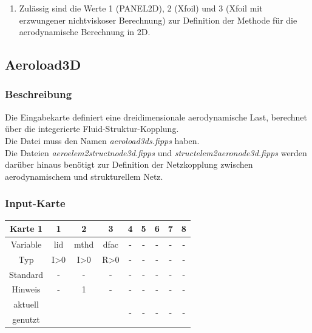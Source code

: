 \documentclass[11pt,titlepage,listof=totoc,bibliography=totoc,twoside]{scrreprt}
\begin{document}
{{\begin{enumerate}
\item Zulässig sind die Werte 1 (PANEL2D), 2 (Xfoil) und 3 (Xfoil mit erzwungener nichtviskoser Berechnung) zur Definition der Methode für die aerodynamische Berechnung in 2D.
\end{enumerate}

\newpage

\subsection{Aeroload3D}

\subsubsection{Beschreibung}

Die Eingabekarte definiert eine dreidimensionale aerodynamische Last, berechnet über die integerierte Fluid-Struktur-Kopplung.\\
Die Datei muss den Namen \emph{aeroload3ds.fipps} haben.\\
Die Dateien \emph{aeroelem2structnode3d.fipps} und \emph{structelem2aeronode3d.fipps} werden darüber hinaus benötigt zur Definition der Netzkopplung zwischen aerodynamischem und strukturellem Netz.

\subsubsection{Input-Karte}

\begin{table}[htbp]
\centering
\begin{tabularx}{\textwidth}{cCCCCCCCC}
\toprule
Karte 1         & 1     & 2          & 3  & 4  & 5  & 6  & 7  & 8  \\
\midrule
Variable        & lid   & mthd       & dfac   & -  & -  & -  & -  & -  \\
Typ             & I>0   & I>0        & R>0  & -  & -  & -  & -  & -  \\
Standard        & -     & -          & -  & -  & -  & -  & -  & -  \\
Hinweis         & -     & 1          & -  & -  & -  & -  & -  & -  \\
aktuell         &  &  &  &   &   &   &   &   \\
genutzt \\
\bottomrule
\end{tabularx}
\end{table}

}}
\end{document}
